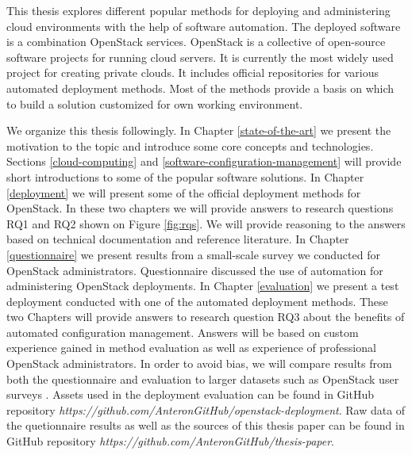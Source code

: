 This thesis explores different popular methods for deploying and administering
cloud environments with the help of software automation. The deployed software
is a combination OpenStack services. OpenStack \cite{sefraoui2012openstack} is
a collective of open-source software projects for running cloud servers. It is
currently the most widely used project for creating private clouds. It includes
official repositories for various automated deployment methods. Most of the
methods provide a basis on which to build a solution customized for own working
environment.

We organize this thesis followingly. In Chapter \ref{state-of-the-art} we
present the motivation to the topic and introduce some core concepts and
technologies. Sections \ref{cloud-computing} and
\ref{software-configuration-management} will provide short introductions to
some of the popular software solutions. In Chapter \ref{deployment} we will
present some of the official deployment methods for OpenStack. In these two
chapters we will provide answers to research questions RQ1 and RQ2 shown on
Figure \ref{fig:rqs}. We will provide reasoning to the answers based on
technical documentation and reference literature. In Chapter
\ref{questionnaire} we present results from a small-scale survey we conducted
for OpenStack administrators. Questionnaire discussed the use of automation for
administering OpenStack deployments. In Chapter \ref{evaluation} we present a
test deployment conducted with one of the automated deployment methods. These
two Chapters will provide answers to research question RQ3 about the benefits
of automated configuration management. Answers will be based on custom
experience gained in method evaluation as well as experience of professional
OpenStack administrators. In order to avoid bias, we will compare results from
both the questionnaire and evaluation to larger datasets such as OpenStack user
surveys \cite{openstack-user-survey-2018}. Assets used in the deployment
evaluation can be found in GitHub repository
\textit{https://github.com/AnteronGitHub/openstack-deployment}. Raw data of the
quetionnaire results as well as the sources of this thesis paper can be found
in GitHub repository \textit{https://github.com/AnteronGitHub/thesis-paper}.

